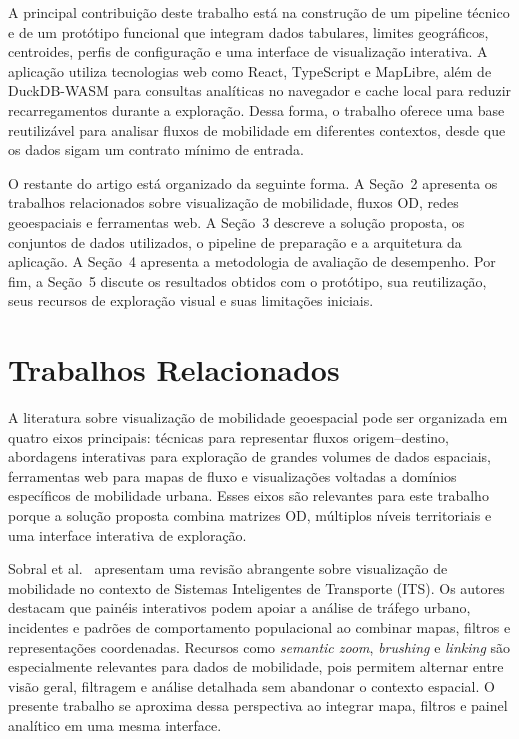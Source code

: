 \documentclass[12pt]{article}
\begin{document}
A principal contribuição deste trabalho está na construção de um pipeline técnico e de um protótipo funcional que integram dados tabulares, limites geográficos, centroides, perfis de configuração e uma interface de visualização interativa. A aplicação utiliza tecnologias web como React, TypeScript e MapLibre, além de DuckDB-WASM para consultas analíticas no navegador e cache local para reduzir recarregamentos durante a exploração. Dessa forma, o trabalho oferece uma base reutilizável para analisar fluxos de mobilidade em diferentes contextos, desde que os dados sigam um contrato mínimo de entrada.

O restante do artigo está organizado da seguinte forma. A Seção~2 apresenta os trabalhos relacionados sobre visualização de mobilidade, fluxos OD, redes geoespaciais e ferramentas web. A Seção~3 descreve a solução proposta, os conjuntos de dados utilizados, o pipeline de preparação e a arquitetura da aplicação. A Seção~4 apresenta a metodologia de avaliação de desempenho. Por fim, a Seção~5 discute os resultados obtidos com o protótipo, sua reutilização, seus recursos de exploração visual e suas limitações iniciais.

\section{Trabalhos Relacionados}

A literatura sobre visualização de mobilidade geoespacial pode ser organizada em quatro eixos principais: técnicas para representar fluxos origem--destino, abordagens interativas para exploração de grandes volumes de dados espaciais, ferramentas web para mapas de fluxo e visualizações voltadas a domínios específicos de mobilidade urbana. Esses eixos são relevantes para este trabalho porque a solução proposta combina matrizes OD, múltiplos níveis territoriais e uma interface interativa de exploração.

Sobral et al.~\cite{s19020332} apresentam uma revisão abrangente sobre visualização de mobilidade no contexto de Sistemas Inteligentes de Transporte (ITS). Os autores destacam que painéis interativos podem apoiar a análise de tráfego urbano, incidentes e padrões de comportamento populacional ao combinar mapas, filtros e representações coordenadas. Recursos como \textit{semantic zoom}, \textit{brushing} e \textit{linking} são especialmente relevantes para dados de mobilidade, pois permitem alternar entre visão geral, filtragem e análise detalhada sem abandonar o contexto espacial. O presente trabalho se aproxima dessa perspectiva ao integrar mapa, filtros e painel analítico em uma mesma interface.
\end{document}
